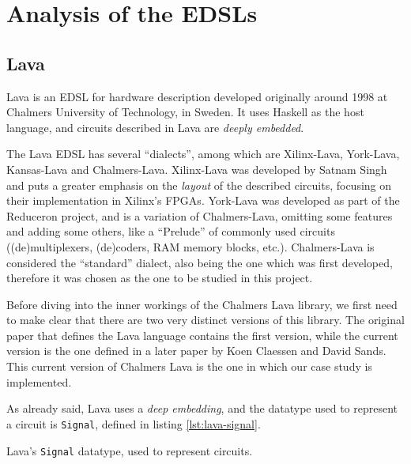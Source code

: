 \section{Analysis of the EDSLs}
\label{sec:edsls}

    \subsection{Lava}
    \label{subsec:lava}

        Lava\cite{lava1998} is an EDSL for hardware description developed originally around 1998 at
        Chalmers University of Technology, in Sweden. It uses Haskell as the host language, and
        circuits described in Lava are \emph{deeply embedded}.

        The Lava EDSL has several ``dialects'', among which are Xilinx-Lava, York-Lava, Kansas-Lava
        and Chalmers-Lava. Xilinx-Lava\cite{xilinx-lava} was developed by Satnam Singh and puts a
        greater emphasis on the \emph{layout} of the described circuits, focusing on their
        implementation in Xilinx's FPGAs. York-Lava was developed as part of the
        Reduceron\cite{reduceron} project, and is a variation of Chalmers-Lava, omitting some
        features and adding some others, like a ``Prelude'' of commonly used circuits
        ((de)multiplexers, (de)coders, RAM memory blocks, etc.). Chalmers-Lava is considered the
        ``standard'' dialect, also being the one which was first developed, therefore it was chosen
        as the one to be studied in this project.

        Before diving into the inner workings of the Chalmers Lava library, we first need to make
        clear that there are two very distinct versions of this library. The original paper that
        defines the Lava language\cite{lava1998} contains the first version, while the current
        version is the one defined in a later paper\cite{observable-sharing-1999} by Koen Claessen
        and David Sands. This current version of Chalmers Lava is the one in which our case study is
        implemented.

        As already said, Lava uses a \emph{deep embedding}, and the datatype used to represent a
        circuit is \texttt{Signal}, defined in listing \ref{lst:lava-signal}.

        \begin{listing}[h!]
            \caption{Lava's \texttt{Signal} datatype, used to represent circuits.
                \label{lst:lava-signal}}
        \end{listing}

